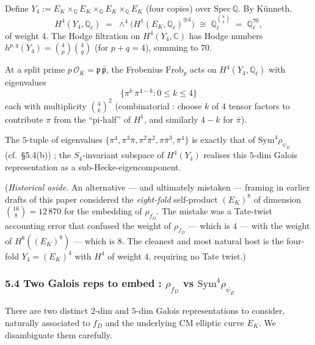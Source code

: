 \documentclass[
  11pt,
  a4paper,
]{amsart}
\begin{document}
Define \(Y_4 := E_K \times_\mathbb{Q} E_K \times_\mathbb{Q} E_K \times_\mathbb{Q} E_K\) (four copies) over \(\mathrm{Spec}\,\mathbb{Q}\). By Künneth,
\[
H^4(Y_4, \mathbb{Q}_\ell) \;=\; \wedge^4 \bigl(H^1(E_K, \mathbb{Q}_\ell)^{\oplus 4}\bigr) \;\cong\; \mathbb{Q}_\ell^{\binom{8}{4}} \;=\; \mathbb{Q}_\ell^{70},
\]
of weight \(4\). The Hodge filtration on \(H^4(Y_4, \mathbb{C})\) has Hodge numbers \(h^{p, q}(Y_4) = \binom{4}{p} \binom{4}{q}\) (for \(p + q = 4\)), summing to \(70\).

At a split prime \(p\,\mathcal{O}_K = \mathfrak{p}\,\bar{\mathfrak{p}}\), the Frobenius \(\mathrm{Frob}_p\) acts on \(H^4(Y_4, \mathbb{Q}_\ell)\) with eigenvalues
\[
\bigl\{ \pi^k\,\bar\pi^{4 - k} : 0 \leq k \leq 4 \bigr\}
\]
each with multiplicity \(\binom{4}{k}^2\) (combinatorial : choose \(k\) of \(4\) tensor factors to contribute \(\pi\) from the ``pi-half'' of \(H^1\), and similarly \(4 - k\) for \(\bar\pi\)).

The \(5\)-tuple of eigenvalues \(\{\pi^4, \pi^3 \bar\pi, \pi^2 \bar\pi^2, \pi \bar\pi^3, \bar\pi^4\}\) is exactly that of \(\mathrm{Sym}^4 \rho_{\psi_E}\) (cf.~§5.4(b)) ; the \(S_4\)-invariant subspace of \(H^4(Y_4)\) realises this \(5\)-dim Galois representation as a sub-Hecke-eigencomponent.

(\emph{Historical aside.} An alternative --- and ultimately mistaken --- framing in earlier drafts of this paper considered the \emph{eight-fold} self-product \((E_K)^8\) of dimension \(\binom{16}{8} = 12\,870\) for the embedding of \(\rho_{f_D}\). The mistake was a Tate-twist accounting error that confused the weight of \(\rho_{f_D}\) --- which is \(4\) --- with the weight of \(H^8((E_K)^8)\) --- which is \(8\). The cleanest and most natural host is the four-fold \(Y_4 = (E_K)^4\) with \(H^4\) of weight \(4\), requiring no Tate twist.)

\hypertarget{two-galois-reps-to-embed-rho_f_d-vs-mathrmsym4-rho_psi_e}{%
\subsubsection{\texorpdfstring{5.4 Two Galois reps to embed : \(\rho_{f_D}\) vs \(\mathrm{Sym}^4 \rho_{\psi_E}\)}{5.4 Two Galois reps to embed : \textbackslash rho\_\{f\_D\} vs \textbackslash mathrm\{Sym\}\^{}4 \textbackslash rho\_\{\textbackslash psi\_E\}}}\label{two-galois-reps-to-embed-rho_f_d-vs-mathrmsym4-rho_psi_e}}

There are two distinct \(2\)-dim and \(5\)-dim Galois representations to consider, naturally associated to \(f_D\) and the underlying CM elliptic curve \(E_K\). We disambiguate them carefully.
\end{document}
